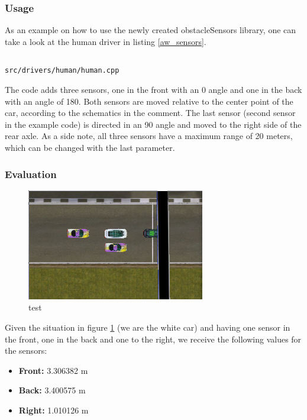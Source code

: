 \documentclass[paper=a4, fontsize=11pt]{scrreprt}
\begin{document}
\subsubsection{Usage}
As an example on how to use the newly created obstacleSensors library,
one can take a look at the human driver in listing \ref{aw_sensors}.

\begin{listing}[ht]
  \inputminted[firstline=245,linenos=true,lastline=256,gobble=4]{c++}{../../../simulators/speed-dreams/src/drivers/human/human.cpp}
  \caption{\texttt{src/drivers/human/human.cpp}}\label{aw_sensors}
\end{listing}

The code adds three sensors, one in the front with an 0\degree{} angle
and one in the back with an angle of 180\degree{}.
Both sensors are moved relative to the center point of the car,
according to the schematics in the comment.
The last sensor (second sensor in the example code) is directed in an 90\degree{} angle
and moved to the right side of the rear axle.
As a side note, all three sensors have a maximum range of 20 meters,
which can be changed with the last parameter.

\subsubsection{Evaluation}
\begin{figure}[ht]
  \begin{center}
  \includegraphics[scale=0.5]{aw_imgs/parked.png}
\end{center}
\caption{test}\label{aw_parked_img}
\end{figure}

Given the situation in figure \ref{aw_parked_img}
(we are the white car) and having one sensor in the front,
one in the back and one to the right,
we receive the following values for the sensors:
\begin{itemize}
  \item \textbf{Front:} 3.306382 m
  \item \textbf{Back:} 3.400575 m
  \item \textbf{Right:} 1.010126 m
\end{itemize}
\end{document}

